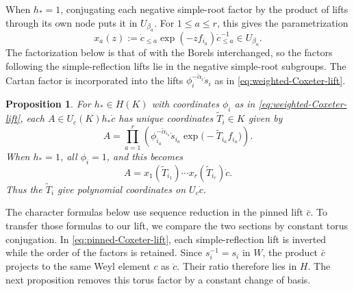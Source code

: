 \documentclass[11pt,leqno]{amsart}
\numberwithin{equation}{section}
\theoremstyle{plain}
\newtheorem{proposition}[theorem]{Proposition}
\theoremstyle{definition}
\theoremstyle{plain}
\theoremstyle{definition}
\theoremstyle{remark}
\begin{document}
When $h_*=1$, conjugating each negative simple-root factor by the product of lifts through its own node puts it in $U_{\beta_a}$. For $1\le a\le r$, this gives the parametrization
\[
 x_a(z):=\dot c_{\le a}\exp(-zf_{i_a})\dot c_{\le a}^{-1}
          \in U_{\beta_a}.
\]
The factorization below is that of \cite[Proposition~8.1]{FKSZ2020} with the Borels interchanged, so the factors following the simple-reflection lifts lie in the negative simple-root subgroups.  The Cartan factor is incorporated into the lifts $\phi_i^{-\check\alpha_i}\dot s_i$ as in \eqref{eq:weighted-Coxeter-lift}.

\begin{proposition}\label{prop:Steinberg-root-coordinates}
For $h_*\in H(K)$ with coordinates $\phi_i$ as in \eqref{eq:weighted-Coxeter-lift}, each $A\in U_c(K)h_*\dot c$ has unique coordinates $\widetilde T_i\in K$ given by
\begin{equation}\label{eq:opposite-Steinberg-factorization}
 A=\prod_{a=1}^r
 \left(\phi_{i_a}^{-\check\alpha_{i_a}}\dot s_{i_a}
              \exp\!\bigl(-\widetilde T_{i_a}f_{i_a}\bigr)\right).
\end{equation}
When $h_*=1$, all $\phi_i=1$, and this becomes
\begin{equation}\label{eq:Uc-root-coordinates}
 A=x_1(\widetilde T_{i_1})\cdots x_r(\widetilde T_{i_r})\dot c.
\end{equation}
Thus the $\widetilde T_i$ give polynomial coordinates on $U_c\dot c$.
\end{proposition}

The character formulas below use sequence reduction in the pinned lift $\bar c$. To transfer those formulas to our lift, we compare the two sections by constant torus conjugation. In \eqref{eq:pinned-Coxeter-lift}, each simple-reflection lift is inverted while the order of the factors is retained.  Since $s_i^{-1}=s_i$ in $W$, the product $\bar c$ projects to the same Weyl element $c$ as $\dot c$.  Their ratio therefore lies in $H$.  The next proposition removes this torus factor by a constant change of basis.
\end{document}
